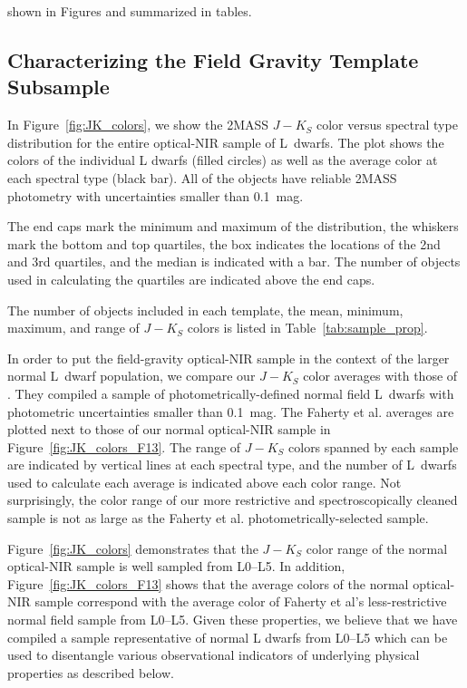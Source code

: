 \documentclass[12pt,preprint]{aastex}
\begin{document}
shown in Figures and summarized in tables.

\subsection{Characterizing the Field Gravity Template Subsample}
\label{sec:templates_normal}

In Figure~\ref{fig:JK_colors}, we show the 2MASS $J-K_S$ color versus spectral type distribution for the entire optical-NIR sample of L~dwarfs. The plot shows the colors of the individual L dwarfs (filled circles) as well as the average color at each spectral type (black bar). All of the objects have reliable 2MASS photometry with uncertainties smaller than 0.1~mag. 

The end caps mark the minimum and maximum of the distribution, the whiskers mark the bottom and top quartiles, the box indicates the locations of the 2nd and 3rd quartiles, and the median is indicated with a bar. The number of objects used in calculating the quartiles are indicated above the end caps.

The number of objects included in each template, the mean, minimum, maximum, and range of $J-K_S$ colors is listed in Table~\ref{tab:sample_prop}. 

In order to put the field-gravity optical-NIR sample in the context of the larger normal L~dwarf population, we compare our $J-K_S$ color averages with those of \citet{Faherty13_0355}. 
They compiled a sample of photometrically-defined normal field L~dwarfs with photometric uncertainties smaller than 0.1~mag. 
The Faherty et al. averages are plotted next to those of our normal optical-NIR sample in Figure~\ref{fig:JK_colors_F13}. 
The range of $J-K_S$ colors spanned by each sample are indicated by vertical lines at each spectral type, and the number of L~dwarfs used to calculate each average is indicated above each color range. Not surprisingly, the color range of our more restrictive and spectroscopically cleaned sample is not as large as the Faherty et al. photometrically-selected sample. 

Figure~\ref{fig:JK_colors} demonstrates that the $J-K_S$ color range of the normal optical-NIR sample is well sampled from L0--L5. 
In addition, Figure~\ref{fig:JK_colors_F13} shows that the average colors of the normal optical-NIR sample correspond with the average color of Faherty et al's less-restrictive normal field sample from L0--L5. 
Given these properties, we believe that we have compiled a sample representative of normal L dwarfs from L0--L5 which can be used to disentangle various observational indicators of underlying physical properties as described below.
\end{document}
